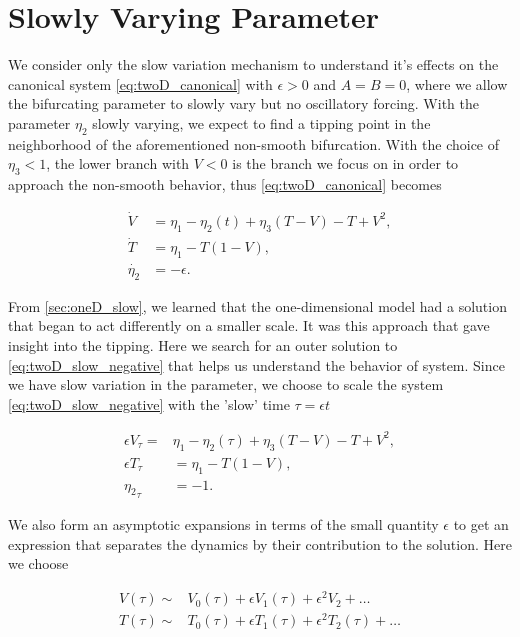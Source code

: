 \section{Slowly Varying Parameter}
\label{sec:twoD_slow}

We consider only the slow variation mechanism to understand it's effects on the canonical system \eqref{eq:twoD_canonical} with $\epsilon>0$ and $A=B=0$, where we allow the bifurcating parameter to slowly vary but no oscillatory forcing. With the parameter $\eta_2$ slowly varying, we expect to find a tipping point in the neighborhood of the aforementioned non-smooth bifurcation. With the choice of $\eta_3<1$, the lower branch with $V<0$ is the branch we focus on in order to approach the non-smooth behavior, thus \eqref{eq:twoD_canonical} becomes

\begin{equation}\label{eq:twoD_slow_negative}
 \begin{aligned}
   \dot{V} & =  \eta_1-\eta_2(t)+\eta_3(T-V)-T+V^2, \\
   \dot{T} & =  \eta_1-T(1-V),  \\
  \dot{\eta_2}  & =  -\epsilon.
  \end{aligned}
\end{equation}

From \autoref{sec:oneD_slow}, we learned that the one-dimensional model had a solution that began to act differently on a smaller scale. It was this approach that gave insight into the tipping. Here we search for an outer solution to \eqref{eq:twoD_slow_negative} that helps us understand the behavior of system.  Since we have slow variation in the parameter, we choose to scale the system \eqref{eq:twoD_slow_negative} with the 'slow' time $\tau=\epsilon t$

\begin{equation}\label{eq:twoD_slow_slowsystem}
\begin{aligned}
\epsilon V_\tau =&\eta_1-\eta_2(\tau)+\eta_3(T-V)-T+V^2, \\
\epsilon T_\tau & =  \eta_1-T(1-V),  \\
  {\eta_2}_\tau  & =  -1.
\end{aligned}
\end{equation}

We also form an asymptotic expansions in terms of the small quantity $\epsilon$ to get an expression that separates the dynamics by their contribution to the solution. Here we choose

\begin{equation}\label{eq:twoD_slow_outerexpansion}
\begin{aligned}
V(\tau)\sim &V_0(\tau)+\epsilon V_1(\tau)+\epsilon^2 V_2+\ldots\\
T(\tau)\sim & T_0(\tau)+\epsilon T_1(\tau)+\epsilon^2 T_2(\tau)+\ldots
\end{aligned}
\end{equation}

